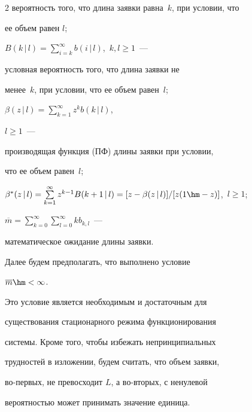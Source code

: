 \begin{multicols}{2}
ве\-ро\-ят\-ность того, что длина заявки равна~$k$, при условии, что


ее объем равен $l$;





\noindent


$B(k\,|\,l)=


\sum\limits_{i=k}^\infty b(i\,|\,l)$,\ $k,l\ge 1$~---


условная вероятность того, что длина заявки не


менее~$k$, при условии, что ее объем равен~$l$;





\noindent


$\beta(z\,|\,l)=\sum\limits_{k=1}^\infty z^k b(k\,|\,l)$,\ 


$l\ge 1$~---


производящая функ\-ция (ПФ) длины заявки при условии,


что ее объем равен~$l$;





\noindent


$\beta^*(z\,|\,l)=


\sum\limits_{k=1}^\infty z^{k-1} B(k+1\,|\,l)


=[z-\beta(z\,|\,l)]/[z(1\hm-z)]$,\  $l\ge 1$;





\noindent


$\overline m=\sum\limits_{k=0}^\infty


\sum\limits_{l=0}^\infty k b_{k,l}$~---


математическое ожидание длины заявки.





Далее будем предполагать, что выполнено условие


$\overline m \hm< \infty$.


Это условие является необходимым и достаточным для


существования стационарного режима функционирования


сис\-те\-мы. Кроме того, чтобы избежать непринципиальных


трудностей в изложении, будем считать, что объем заявки,


во-пер\-вых, не превосходит $L$, а во-вто\-рых, с ненулевой


вероятностью может принимать значение единица.






\end{multicols}
